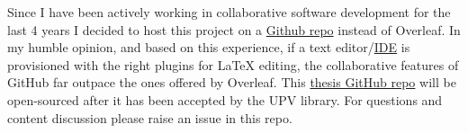 Since I have been actively working in collaborative software development for the last 4 years I decided to host this project on a \href{https://github.com/ricarvid1/dsj-thesis}{Github repo} instead of Overleaf.
In my humble opinion, and based on this experience, if a text editor/\href{https://medium.com/@rcpassos/writing-latex-documents-in-visual-studio-code-with-latex-workshop-d9af6a6b2815}{IDE} is provisioned with the right plugins for LaTeX editing, the collaborative features of GitHub far outpace the ones offered by Overleaf.
This \href{https://github.com/ricarvid1/dsj-thesis}{thesis GitHub repo} will be open-sourced after it has been accepted by the UPV library.
For questions and content discussion please raise an issue in this repo.
